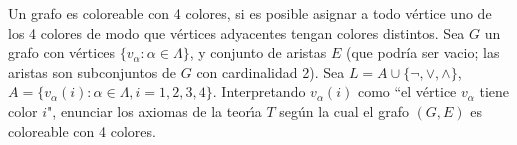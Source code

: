 \begin{problem}[3]
Un grafo es coloreable con 4 colores, si es posible asignar a todo v\'ertice uno de los 4 colores de modo
que v\'ertices adyacentes tengan colores distintos. Sea $G$ un grafo con v\'ertices $\{v_\alpha : \alpha \in\Lambda\}$,
y conjunto de aristas $E$ (que podr\'ia ser vacio; las aristas son subconjuntos de $G$ con cardinalidad 2).
Sea $L =  A \cup \{\neg, \vee, \wedge \}$, $A = \{v_\alpha(i) : \alpha \in\Lambda, i = 1, 2, 3, 4\}$. Interpretando 
$v_\alpha(i)$ como ``el v\'ertice $v_\alpha$ tiene color $i$", enunciar los axiomas de la teor\'{\i}a $T$ seg\'un la
cual el grafo $(G, E)$ es coloreable con 4 colores. 
\solution
\end{problem}